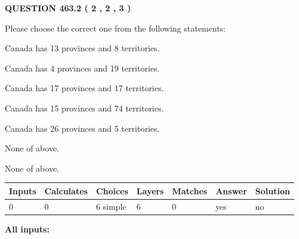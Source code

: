 \documentclass[12pt]{article}
\begin{document}
   
  
\vspace{0.2in}
  
{\textbf{\Large{QUESTION
463.2 
 ( 2 , 2 , 3 )
}}}
  
  
Please choose the correct one from the following statements:
 
 
Canada has  13 provinces and  8 territories.
 
 
Canada has   4 provinces and  19 territories.
 
 
Canada has  17 provinces and  17 territories.
 
 
Canada has  15 provinces and  74 territories.
 
 
Canada has  26 provinces and  5 territories.
 
 
 None of above.
 
 
\noindent{}
 
 
 None of above.
 
 
\noindent{}
 
 
   
   
   
   
\noindent\begin{tabular}{|l|l|l|l|l|l|l|}
 \hline
Inputs & Calculates & Choices & Layers & Matches & Answer & Solution \\ \hline
 0  & 
 0  & 
 6
  simple  
  & 
 6  & 
 0  & 
  yes & 
  no 
  \\ \hline
 \end{tabular}
   
   
   
   
\noindent{}
   
   
   
   
\noindent\vspace{0.1in}\hspace{-0.08in} {\textbf{\Large{All inputs: }}}
   
   
   
   
   
   
 \vspace{0.2in}
 
\end{document}
